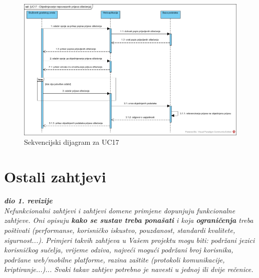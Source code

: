 \begin{figure}[H]
	\includegraphics[scale=0.5]{slike/UC17_sekvencijski.jpg} %
	\centering
	\caption{Sekvencijski dijagram za UC17}
	\label{fig:SekvencijskiDijagramKreiranjePrijaveOštećenja}
\end{figure}



\section{Ostali zahtjevi}

\textbf{\textit{dio 1. revizije}}\\

\textit{Nefunkcionalni zahtjevi i zahtjevi domene primjene dopunjuju funkcionalne zahtjeve. Oni opisuju \textbf{kako se sustav treba ponašati} i koja \textbf{ograničenja} treba poštivati (performanse, korisničko iskustvo, pouzdanost, standardi kvalitete, sigurnost...). Primjeri takvih zahtjeva u Vašem projektu mogu biti: podržani jezici korisničkog sučelja, vrijeme odziva, najveći mogući podržani broj korisnika, podržane web/mobilne platforme, razina zaštite (protokoli komunikacije, kriptiranje...)... Svaki takav zahtjev potrebno je navesti u jednoj ili dvije rečenice.}

